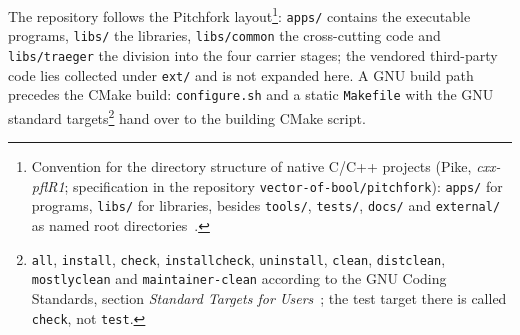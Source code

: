 The repository follows the Pitchfork layout\footnote{Convention for the directory structure of native
C/C++ projects (Pike, \emph{cxx-pflR1}; specification in the repository \texttt{vector-of-bool/pitchfork}):
\texttt{apps/} for programs, \texttt{libs/} for libraries, besides \texttt{tools/}, \texttt{tests/},
\texttt{docs/} and \texttt{external/} as named root directories~\cite{pike2018pitchfork}.}:
\texttt{apps/} contains the executable programs, \texttt{libs/} the libraries, \texttt{libs/common}
the cross-cutting code and \texttt{libs/traeger} the division into the four carrier stages; the vendored
third-party code lies collected under \texttt{ext/} and is not expanded here. A GNU build path precedes
the CMake build: \texttt{configure.sh} and a static \texttt{Makefile} with the GNU standard
targets\footnote{\texttt{all}, \texttt{install}, \texttt{check}, \texttt{installcheck},
\texttt{uninstall}, \texttt{clean}, \texttt{distclean}, \texttt{mostlyclean} and
\texttt{maintainer-clean} according to the GNU Coding Standards, section \emph{Standard Targets for
Users}~\cite{gnu2026standards}; the test target there is called \texttt{check}, not \texttt{test}.} hand
over to the building CMake script.

